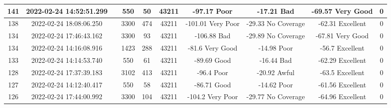 \begin{longtable*}{|c|c|c|c|c|c|c|c|c|c|}
141&2022-02-24 14:52:51.299&&550&50&43211& -97.17    Poor        & -17.21    Bad         & -69.57    Very Good   & 0\\\hline
{}138&2022-02-24 18:08:06.250&&3300&474&43211& -101.01   Very Poor   & -29.33    No Coverage & -62.31    Excellent   & 0\\\hline
{}134&2022-02-24 17:46:43.162&&3300&93&43211& -106.88   Bad         & -29.89    No Coverage & -67.81    Very Good   & 0\\\hline
{}134&2022-02-24 14:16:08.916&&1423&288&43211& -81.6     Very Good   & -14.98    Poor        & -56.7     Excellent   & 0\\\hline
{}133&2022-02-24 14:14:53.740&&550&61&43211& -89.69    Good        & -16.44    Bad         & -62.29    Excellent   & 0\\\hline
{}128&2022-02-24 17:37:39.183&&3102&413&43211& -96.4     Poor        & -20.92    Awful       & -63.5     Excellent   & 0\\\hline
{}127&2022-02-24 14:12:40.417&&550&58&43211& -86.71    Good        & -14.62    Poor        & -61.56    Excellent   & 0\\\hline
{}126&2022-02-24 17:44:00.992&&3300&104&43211& -104.2    Very Poor   & -29.77    No Coverage & -64.96    Excellent   & 0\\\hline

\end{longtable*}
